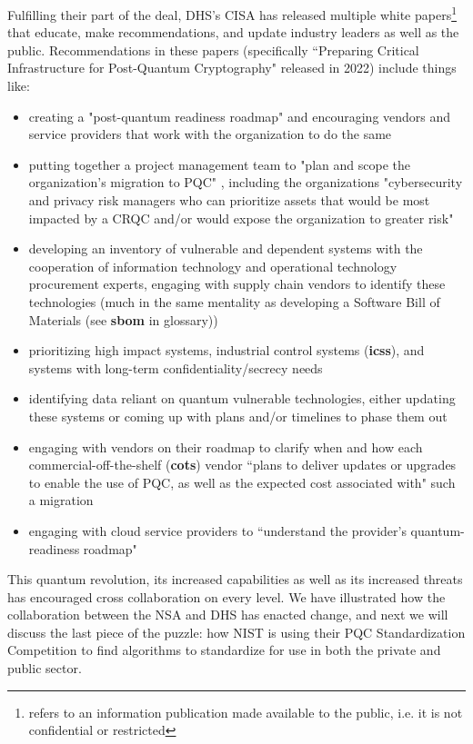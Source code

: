 Fulfilling their part of the deal, DHS's CISA has released multiple white papers\footnote{refers to an information publication made available to the public, i.e. it is not confidential or restricted} that educate, make recommendations, and update industry leaders as well as the public. Recommendations in these papers (specifically ``Preparing Critical Infrastructure for Post-Quantum Cryptography" released in 2022) include things like:
\begin{itemize}
    \item creating a "post-quantum readiness roadmap" and encouraging vendors and service providers that work with the organization to do the same
    \item putting together a project management team to "plan and scope the organization's migration to PQC" , including the organizations "cybersecurity and privacy risk managers who can prioritize assets that would be most impacted by a CRQC and/or would expose the organization to greater risk" 
    \item developing an inventory of vulnerable and dependent systems with the cooperation of information technology and operational technology procurement experts, engaging with supply chain vendors to identify these technologies (much in the same mentality as developing a Software Bill of Materials (see \textbf{\gls{sbom}} in glossary))
    \item prioritizing high impact systems, industrial control systems (\textbf{\glspl{ics}}), and systems with long-term confidentiality/secrecy needs
    \item identifying data reliant on quantum vulnerable technologies, either updating these systems or coming up with plans and/or timelines to phase them out
    \item engaging with vendors on their roadmap to clarify when and how each commercial-off-the-shelf (\textbf{\gls{cots}}) vendor ``plans to deliver updates or upgrades to enable the use of PQC, as well as the expected cost associated with" such a migration
    \item engaging with cloud service providers to ``understand the provider's quantum-readiness roadmap" 
\end{itemize}

This quantum revolution, its increased capabilities as well as its increased threats has encouraged cross collaboration on every level. We have illustrated how the collaboration between the NSA and DHS has enacted change, and next we will discuss the last piece of the puzzle: how NIST is using their PQC Standardization Competition to find algorithms to standardize for use in both the private and public sector.